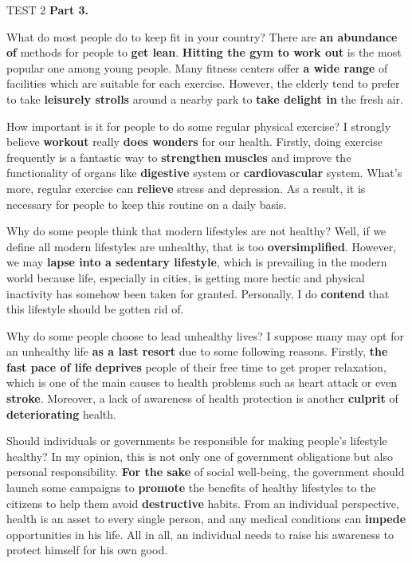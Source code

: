\begin{glossarymc}[Cambridge 6]
\begin{test}{TEST 2}
    \noindent
    \textbf{Part 3.}
    \begin{qa}{What do most people do to keep fit in your country?}
    There are \textbf{an abundance of} methods for people to \textbf{get lean}. \textbf{Hitting the gym to work out} is the most popular one among young people. Many fitness centers offer \textbf{a wide range} of facilities which are suitable for each exercise. However, the elderly tend to prefer to take \textbf{leisurely strolls} around a nearby park to \textbf{take delight in} the fresh air.
    \end{qa}

    \begin{qa}{How important is it for people to do some regular physical exercise?}
    I strongly believe \textbf{workout} really \textbf{does wonders} for our health. Firstly, doing exercise frequently is a fantastic way to \textbf{strengthen} \textbf{muscles} and improve the functionality of organs like \textbf{digestive} system or \textbf{cardiovascular} system. What’s more, regular exercise can \textbf{relieve} stress and depression. As a result, it is necessary for people to keep this routine on a daily basis.
    \end{qa}

    \begin{qa}{Why do some people think that modern lifestyles are not healthy?}
    Well, if we define all modern lifestyles are unhealthy, that is too \textbf{oversimplified}. However, we may \textbf{lapse into a sedentary lifestyle}, which is prevailing in the modern world because life, especially in cities, is getting more hectic and physical inactivity has somehow been taken for granted. Personally, I do \textbf{contend} that this lifestyle should be gotten rid of.
    \end{qa}

    \begin{qa}{Why do some people choose to lead unhealthy lives?}
    I suppose many may opt for an unhealthy life \textbf{as a last resort} due to some following reasons. Firstly, \textbf{the fast pace of life} \textbf{deprives} people of their free time to get proper relaxation, which is one of the main causes to health problems such as heart attack or even \textbf{stroke}. Moreover, a lack of awareness of health protection is another \textbf{culprit} of \textbf{deteriorating} health.
    \end{qa}

    \begin{qa}{Should individuals or governments be responsible for making people's lifestyle healthy?}
    In my opinion, this is not only one of government obligations but also personal responsibility. \textbf{For the sake} of social well-being, the government should launch some campaigns to \textbf{promote} the benefits of healthy lifestyles to the citizens to help them avoid \textbf{destructive} habits. From an individual perspective, health is an asset to every single person, and any medical conditions can \textbf{impede} opportunities in his life. All in all, an individual needs to raise his awareness to protect himself for his own good.
    \end{qa}


\end{test}
\end{glossarymc}
